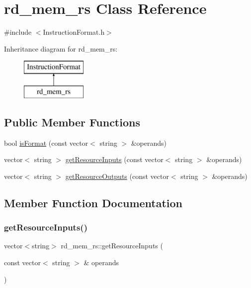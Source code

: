 \hypertarget{classrd__mem__rs}{}\section{rd\+\_\+mem\+\_\+rs Class Reference}
\label{classrd__mem__rs}


{\ttfamily \#include $<$Instruction\+Format.\+h$>$}

Inheritance diagram for rd\+\_\+mem\+\_\+rs\+:\begin{figure}[H]
\begin{center}
\leavevmode
\includegraphics[height=2.000000cm]{classrd__mem__rs}
\end{center}
\end{figure}
\subsection*{Public Member Functions}
\begin{DoxyCompactItemize}
\item 
bool \hyperlink{classrd__mem__rs_ad9242fac1115765f6cf9f6cf632d8d25}{is\+Format} (const vector$<$ string $>$ \&operands)
\item 
vector$<$ string $>$ \hyperlink{classrd__mem__rs_aab55c71432b31ddd0ac1b9a89a6e29e5}{get\+Resource\+Inputs} (const vector$<$ string $>$ \&operands)
\item 
vector$<$ string $>$ \hyperlink{classrd__mem__rs_a9f22532c1535bba6776bf7051c50de0f}{get\+Resource\+Outputs} (const vector$<$ string $>$ \&operands)
\end{DoxyCompactItemize}


\subsection{Member Function Documentation}
\mbox{\label{classrd__mem__rs_aab55c71432b31ddd0ac1b9a89a6e29e5}} 
\subsubsection{\texorpdfstring{get\+Resource\+Inputs()}{getResourceInputs()}}
{\footnotesize\ttfamily vector$<$string$>$ rd\+\_\+mem\+\_\+rs\+::get\+Resource\+Inputs (\begin{DoxyParamCaption}\item[{const vector$<$ string $>$ \&}]{operands }\end{DoxyParamCaption})\hspace{0.3cm}{\ttfamily [virtual]}}

